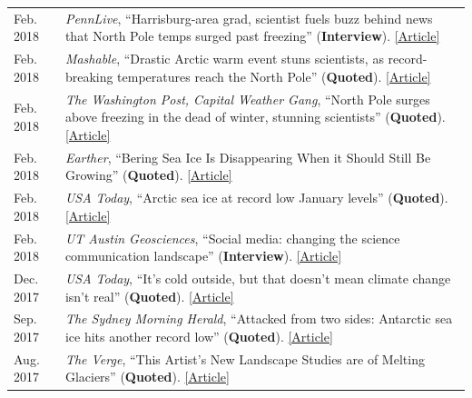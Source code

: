\documentclass[margin,line,palatino,courier,10pt]{res}
\begin{document}
\begin{resume}
\begin{tabular}{@{}p{0.9in}p{4in}}
Feb. 2018 & \textit{PennLive}, ``Harrisburg-area grad, scientist fuels buzz behind news that North Pole temps surged past freezing'' (\textbf{Interview}). \href{http://www.pennlive.com/news/2018/02/harrisburg-area_scientist_is_b.html}{[Article]}\\
Feb. 2018 & \textit{Mashable}, ``Drastic Arctic warm event stuns scientists, as record-breaking temperatures reach the North Pole'' (\textbf{Quoted}). \href{https://mashable.com/2018/02/26/arctic-heat-wave-north-pole-february-sea-ice/?utm_cid=hp-h-2#jZ.Ip1wPjkqD}{[Article]}\\
Feb. 2018 & \textit{The Washington Post, Capital Weather Gang}, ``North Pole surges above freezing in the dead of winter, stunning scientists'' (\textbf{Quoted}). \href{https://www.washingtonpost.com/news/capital-weather-gang/wp/2018/02/26/north-pole-surges-above-freezing-in-the-dead-of-winter-stunning-scientists/?utm_term=.6025384d6bf1}{[Article]}\\
Feb. 2018 & \textit{Earther}, ``Bering Sea Ice Is Disappearing When it Should Still Be Growing'' (\textbf{Quoted}). \href{https://earther.com/bering-sea-ice-is-disappearing-at-a-time-when-it-should-1823193914}{[Article]}\\
Feb. 2018 & \textit{USA Today}, ``Arctic sea ice at record low January levels'' (\textbf{Quoted}). \href{https://www.usatoday.com/story/weather/2018/02/20/arctic-sea-ice-record-low-january-levels/355738002/}{[Article]}\\
Feb. 2018 & \textit{UT Austin Geosciences}, ``Social media: changing the science communication landscape'' (\textbf{Interview}). \href{https://www.jsg.utexas.edu/science-yall/social-media-landscape/}{[Article]}\\
Dec. 2017 & \textit{USA Today}, ``It's cold outside, but that doesn't mean climate change isn't real'' (\textbf{Quoted}). \href{https://www.usatoday.com/story/weather/2017/12/28/its-cold-outside-but-doesnt-mean-climate-change-isnt-real/987948001/}{[Article]}\\
Sep. 2017 & \textit{The Sydney Morning Herald}, ``Attacked from two sides: Antarctic sea ice hits another record low'' (\textbf{Quoted}). \href{http://www.smh.com.au/environment/climate-change/attacked-from-two-sides-antarctic-sea-ice-hits-another-record-low-20170926-gyouuc.html}{[Article]}\\
Aug. 2017 & \textit{The Verge}, ``This Artist's New Landscape Studies are of Melting Glaciers'' (\textbf{Quoted}). \href{https://www.theverge.com/2017/8/22/16171276/anthropocene-nasa-justin-brice-guariglia-photography-climate-change}{[Article]}\\

\end{tabular}
\end{resume}
\end{document}
